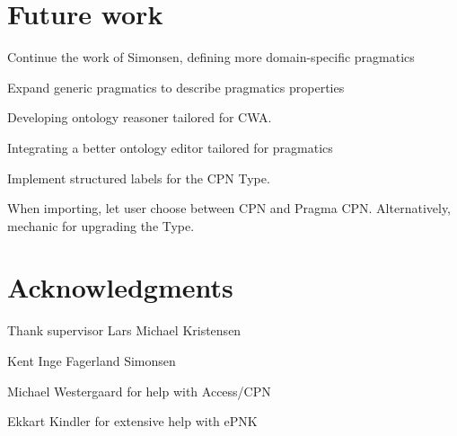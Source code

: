 \section{Future work}

Continue the work of Simonsen, defining more domain-specific pragmatics

Expand generic pragmatics to describe pragmatics properties

Developing ontology reasoner tailored for CWA.

Integrating a better ontology editor tailored for pragmatics

Implement structured labels for the CPN Type.

When importing, let user choose between CPN and Pragma CPN. Alternatively,
mechanic for upgrading the Type.

\section{Acknowledgments}

Thank supervisor Lars Michael Kristensen

Kent Inge Fagerland Simonsen

Michael Westergaard for help with Access/CPN

Ekkart Kindler for extensive help with ePNK